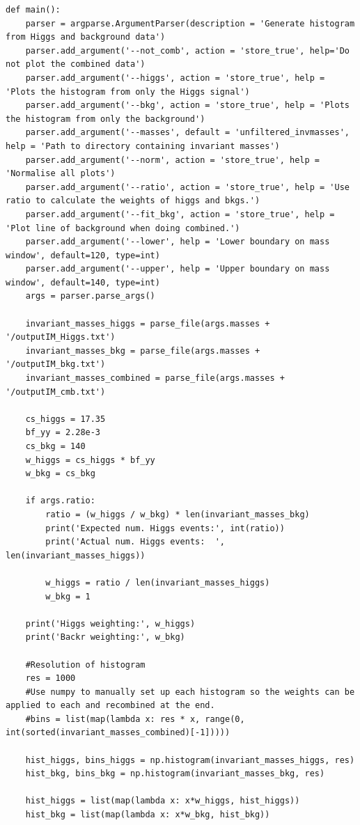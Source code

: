 \documentclass{article}
\begin{document}
\begin{lstlisting}
def main():
    parser = argparse.ArgumentParser(description = 'Generate histogram from Higgs and background data')
    parser.add_argument('--not_comb', action = 'store_true', help='Do not plot the combined data')
    parser.add_argument('--higgs', action = 'store_true', help = 'Plots the histogram from only the Higgs signal')
    parser.add_argument('--bkg', action = 'store_true', help = 'Plots the histogram from only the background')
    parser.add_argument('--masses', default = 'unfiltered_invmasses', help = 'Path to directory containing invariant masses')
    parser.add_argument('--norm', action = 'store_true', help = 'Normalise all plots')
    parser.add_argument('--ratio', action = 'store_true', help = 'Use ratio to calculate the weights of higgs and bkgs.')
    parser.add_argument('--fit_bkg', action = 'store_true', help = 'Plot line of background when doing combined.')
    parser.add_argument('--lower', help = 'Lower boundary on mass window', default=120, type=int)
    parser.add_argument('--upper', help = 'Upper boundary on mass window', default=140, type=int)
    args = parser.parse_args()

    invariant_masses_higgs = parse_file(args.masses + '/outputIM_Higgs.txt')
    invariant_masses_bkg = parse_file(args.masses + '/outputIM_bkg.txt')
    invariant_masses_combined = parse_file(args.masses + '/outputIM_cmb.txt')

    cs_higgs = 17.35
    bf_yy = 2.28e-3
    cs_bkg = 140
    w_higgs = cs_higgs * bf_yy
    w_bkg = cs_bkg

    if args.ratio:
        ratio = (w_higgs / w_bkg) * len(invariant_masses_bkg)
        print('Expected num. Higgs events:', int(ratio))
        print('Actual num. Higgs events:  ', len(invariant_masses_higgs))

        w_higgs = ratio / len(invariant_masses_higgs)
        w_bkg = 1

    print('Higgs weighting:', w_higgs)
    print('Backr weighting:', w_bkg)

    #Resolution of histogram
    res = 1000
    #Use numpy to manually set up each histogram so the weights can be applied to each and recombined at the end.
    #bins = list(map(lambda x: res * x, range(0, int(sorted(invariant_masses_combined)[-1]))))

    hist_higgs, bins_higgs = np.histogram(invariant_masses_higgs, res)
    hist_bkg, bins_bkg = np.histogram(invariant_masses_bkg, res)

    hist_higgs = list(map(lambda x: x*w_higgs, hist_higgs))
    hist_bkg = list(map(lambda x: x*w_bkg, hist_bkg))


\end{lstlisting}
\end{document}

